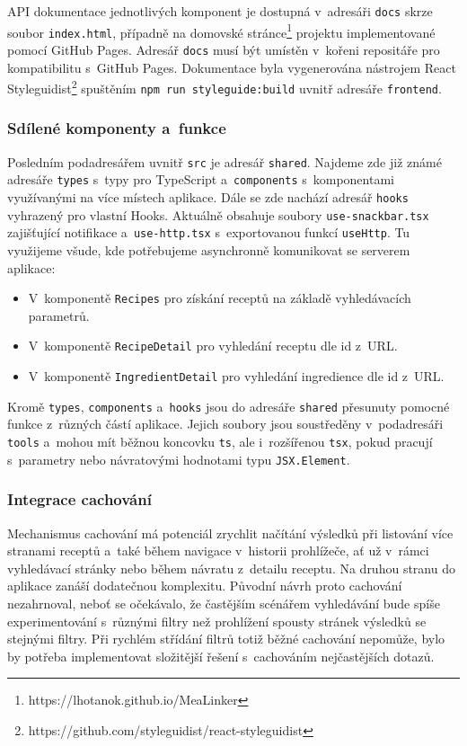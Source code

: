 API dokumentace jednotlivých komponent je dostupná v~adresáři \texttt{docs} skrze soubor \texttt{index.html}, případně na domovské stránce\footnote{https://lhotanok.github.io/MeaLinker} projektu implementované pomocí GitHub Pages. Adresář \texttt{docs} musí být umístěn v~kořeni repositáře pro kompatibilitu s~GitHub Pages. Dokumentace byla vygenerována nástrojem React Styleguidist\footnote{https://github.com/styleguidist/react-styleguidist} spuštěním \texttt{npm run styleguide:build} uvnitř adresáře \texttt{frontend}.

\subsubsection{Sdílené komponenty a~funkce}

Posledním podadresářem uvnitř \texttt{src} je adresář \texttt{shared}. Najdeme zde již zná\-mé adresáře \texttt{types} s~typy pro TypeScript a~\texttt{components} s~komponentami využívanými na více místech aplikace. Dále se zde nachází adresář \texttt{hooks} vyhrazený pro vlastní Hooks. Aktuálně obsahuje soubory \texttt{use-snackbar.tsx} zajišťující notifikace a~\texttt{use-http.tsx} s~exportovanou funkcí \texttt{useHttp}. Tu využijeme všude, kde potřebujeme asynchronně komunikovat se serverem aplikace: 
\begin{itemize}
    \item V~komponentě \texttt{Recipes} pro získání receptů na základě vyhledávacích parametrů.
    \item V~komponentě \texttt{RecipeDetail} pro vyhledání receptu dle id z~URL.
    \item V~komponentě \texttt{IngredientDetail} pro vyhledání ingredience dle id z~URL.
\end{itemize}
Kromě \texttt{types}, \texttt{components} a~\texttt{hooks} jsou do adresáře \texttt{shared} přesunuty pomocné funkce z~různých částí aplikace. Jejich soubory jsou soustředěny v~podadresáři \texttt{tools} a~mohou mít běžnou koncovku \texttt{ts}, ale i~rozšířenou \texttt{tsx}, pokud pracují s~parametry nebo návratovými hodnotami typu \texttt{JSX.Element}.

\subsubsection{Integrace cachování}

Mechanismus cachování má potenciál zrychlit načítání výsledků při listování více stranami receptů a~také během navigace v~historii prohlížeče, ať už v~rámci vyhledávací stránky nebo během návratu z~detailu receptu. Na druhou stranu do aplikace zanáší dodatečnou komplexitu. Původní návrh proto cachování nezahrnoval, neboť se očekávalo, že častějším scénářem vyhledávání bude spíše experimentování s~různými filtry než prohlížení spousty stránek výsledků se stejnými filtry. Při rychlém střídání filtrů totiž běžné cachování nepomůže, bylo by potřeba implementovat složitější řešení s~cachováním nejčastějších dotazů.

